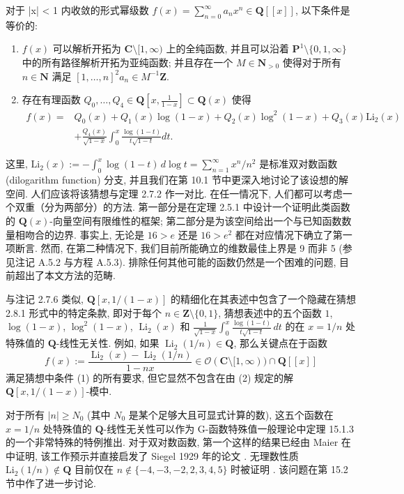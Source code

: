 \begin{conjecture}\label{conj:2.8.1}
对于 |x| < 1 内收敛的形式幂级数 \(f(x) = \sum_{n=0}^{\infty} a_n x^n \in \mathbf{Q}[\![x]\!]\), 以下条件是等价的:
\begin{enumerate}
  \item[(1)] \(f(x)\) 可以解析开拓为 \(\mathbf{C} \setminus [1, \infty)\) 上的全纯函数, 并且可以沿着 \(\mathbf{P}^1 \setminus \{0, 1, \infty\}\) 中的所有路径解析开拓为亚纯函数; 并且存在一个 \(M \in \mathbf{N}_{>0}\) 使得对于所有 \(n \in \mathbf{N}\) 满足 \([1, \dots, n]^2 a_n \in M^{-1}\mathbf{Z}\).
  \item[(2)] 存在有理函数 \(Q_0, \dots, Q_4 \in \mathbf{Q}\left[x, \frac{1}{1-x}\right] \subset \mathbf{Q}(x)\) 使得
    \[
    \begin{aligned}
      f(x) = {} & Q_0(x) + Q_1(x)\log(1-x) + Q_2(x)\log^2(1-x) + Q_3(x)\text{Li}_2(x) \\
      & + \frac{Q_4(x)}{\sqrt{1-x}} \int_0^x \frac{\log(1-t)}{t\sqrt{1-t}} dt.
    \end{aligned}
    \]
\end{enumerate}
这里, \(\text{Li}_2(x) := -\int_0^x \log(1-t)\,d\log t = \sum_{n=1}^\infty x^n/n^2\) 是标准双对数函数 (dilogarithm function) 分支, 并且我们在第 10.1 节中更深入地讨论了该设想的解空间.
人们应该将该猜想与定理 2.7.2 作一对比.
在任一情况下, 人们都可以考虑一个双重（分为两部分）的方法.
第一部分是在定理 2.5.1 中设计一个证明此类函数的 \(\mathbf{Q}(x)\)-向量空间有限维性的框架;
第二部分是为该空间给出一个与已知函数数量相吻合的边界.
事实上, 无论是 \(16 > e\) 还是 \(16 > e^2\) 都在对应情况下确立了第一项断言.
然而, 在第二种情况下, 我们目前所能确立的维数最佳上界是 9 而非 5 (参见注记 A.5.2 与方程 A.5.3).
排除任何其他可能的函数仍然是一个困难的问题, 目前超出了本文方法的范畴.
\end{conjecture}

\begin{remark}\label{rem:2.8.2}
与注记 2.7.6 类似, \(\mathbf{Q}[x,1/(1-x)]\) 的精细化在其表述中包含了一个隐藏在猜想 2.8.1 形式中的特定条款, 即对于每个 \(n\in\mathbf{Z}\setminus\{0,1\}\), 猜想表述中的五个函数 \(1\), \(\log(1-x)\), \(\log^2(1-x)\), \(\operatorname{Li}_2(x)\) 和 \(\frac{1}{\sqrt{1-x}}\int_0^x \frac{\log(1-t)}{t\sqrt{1-t}}\,dt\) 的在 \(x=1/n\) 处特殊值的 \(\mathbf{Q}\)-线性无关性. 例如, 如果 \(\operatorname{Li}_2(1/n)\in\mathbf{Q}\), 那么关键点在于函数
\[ f(x) := \frac{\operatorname{Li}_2(x) - \operatorname{Li}_2(1/n)}{1 - nx} \in \mathcal{O}(\mathbf{C} \setminus [1, \infty)) \cap \mathbf{Q}[\![x]\!] \]
满足猜想中条件 (1) 的所有要求, 但它显然不包含在由 (2) 规定的解 \(\mathbf{Q}[x,1/(1-x)]\)-模中.

对于所有 \(|n| \geq N_0\) (其中 \(N_0\) 是某个足够大且可显式计算的数), 这五个函数在 \(x = 1/n\) 处特殊值的 \(\mathbf{Q}\)-线性无关性可以作为 G-函数特殊值一般理论中定理 15.1.3 的一个非常特殊的特例推出. 对于双对数函数, 第一个这样的结果已经由 Maier 在 \cite[§ 8]{Mai27} 中证明, 该工作预示并直接启发了 Siegel 1929 年的论文 \cite{Zan14}. 无理数性质 \(\text{Li}_2(1/n) \notin \mathbf{Q}\) 目前仅在 \(n \notin \{-4, -3, -2, 2, 3, 4, 5\}\) 时被证明 \cite{Hat93, RV05, RV19}. 该问题在第 15.2 节中作了进一步讨论.
\end{remark}

